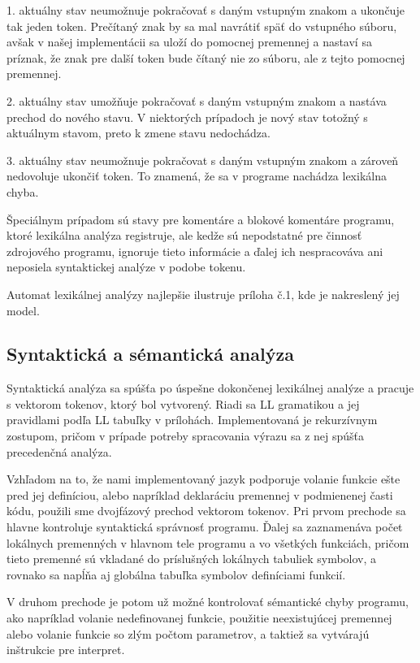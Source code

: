 \documentclass[12pt,a4paper,titlepage,final]{article}
\begin{document}
1. aktuálny stav neumožnuje pokračovať s daným vstupným znakom a ukončuje tak
jeden token. Prečítaný znak by sa mal navrátiť späť do vstupného súboru, avšak v našej
implementácii sa uloží do pomocnej premennej a nastaví sa príznak, že znak pre
další token bude čítaný nie zo súboru, ale z tejto pomocnej premennej.

2. aktuálny stav umožňuje pokračovať s daným vstupným znakom a nastáva prechod do nového stavu.
V niektorých prípadoch je nový stav totožný s aktuálnym stavom, preto k zmene stavu nedochádza.

3. aktuálny stav neumožnuje pokračovat s daným vstupným znakom a zároveň
nedovoluje ukončiť token. To znamená, že sa v programe nachádza lexikálna chyba.

Špeciálnym prípadom sú stavy pre komentáre a blokové komentáre programu, ktoré
lexikálna analýza registruje, ale kedže sú nepodstatné pre činnosť zdrojového
programu, ignoruje tieto informácie a ďalej ich nespracováva ani neposiela
syntaktickej analýze v podobe tokenu.

Automat lexikálnej analýzy najlepšie ilustruje príloha č.1, kde je nakreslený jej model.

\subsection{Syntaktická a sémantická analýza}
Syntaktická analýza sa spúšťa po úspešne dokončenej lexikálnej analýze a pracuje s vektorom tokenov,
ktorý bol vytvorený. Riadi sa LL gramatikou a jej pravidlami podľa LL tabuľky v prílohách.
Implementovaná je rekurzívnym zostupom, pričom v prípade potreby spracovania výrazu sa
z nej spúšťa precedenčná analýza.

Vzhľadom na to, že nami implementovaný jazyk podporuje volanie funkcie ešte pred
jej definíciou, alebo napríklad deklaráciu premennej v podmienenej časti kódu,
použili sme dvojfázový prechod vektorom tokenov. Pri prvom prechode sa hlavne kontroluje syntaktická
správnosť programu. Ďalej sa zaznamenáva počet lokálnych premenných v hlavnom tele programu a vo 
všetkých funkciách, pričom tieto premenné sú vkladané do príslušných lokálnych tabuliek symbolov, a rovnako
sa napĺňa aj globálna tabuľka symbolov definíciami funkcií.

V druhom prechode je potom už možné kontrolovať sémantické chyby programu, ako napríklad volanie
nedefinovanej funkcie, použitie neexistujúcej premennej alebo volanie funkcie so zlým počtom parametrov,
a taktiež sa vytvárajú inštrukcie pre interpret.
\end{document}
